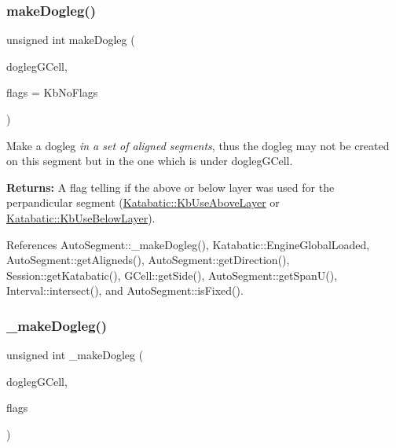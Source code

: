 \mbox{\label{classKatabatic_1_1AutoSegment_aa21b16647c1750ba8b3eb9d99b12f073}} 
\subsubsection{\texorpdfstring{make\+Dogleg()}{makeDogleg()}\hspace{0.1cm}{\footnotesize\ttfamily [3/3]}}
{\footnotesize\ttfamily unsigned int make\+Dogleg (\begin{DoxyParamCaption}\item[{\mbox{\hyperlink{classKatabatic_1_1GCell}{G\+Cell}} $\ast$}]{dogleg\+G\+Cell,  }\item[{unsigned int}]{flags = {\ttfamily KbNoFlags} }\end{DoxyParamCaption})}

Make a dogleg {\itshape in a set of aligned segments}, thus the dogleg may not be created on {\ttfamily this} segment but in the one which is under {\ttfamily dogleg\+G\+Cell}.

{\bfseries Returns\+:} A flag telling if the above or below layer was used for the perpandicular segment (\mbox{\hyperlink{namespaceKatabatic_a2af2ad6b6441614038caf59d04b3b217af756099f1bbe259dd1bf22067dc40eac}{Katabatic\+::\+Kb\+Use\+Above\+Layer}} or \mbox{\hyperlink{namespaceKatabatic_a2af2ad6b6441614038caf59d04b3b217a41cbd981337678e042354f340bfae25d}{Katabatic\+::\+Kb\+Use\+Below\+Layer}}). 

References Auto\+Segment\+::\+\_\+make\+Dogleg(), Katabatic\+::\+Engine\+Global\+Loaded, Auto\+Segment\+::get\+Aligneds(), Auto\+Segment\+::get\+Direction(), Session\+::get\+Katabatic(), G\+Cell\+::get\+Side(), Auto\+Segment\+::get\+Span\+U(), Interval\+::intersect(), and Auto\+Segment\+::is\+Fixed().

\mbox{\label{classKatabatic_1_1AutoSegment_a37a14b40295ccb50cd5001891385807b}} 
\subsubsection{\texorpdfstring{\+\_\+make\+Dogleg()}{\_makeDogleg()}}
{\footnotesize\ttfamily unsigned int \+\_\+make\+Dogleg (\begin{DoxyParamCaption}\item[{\mbox{\hyperlink{classKatabatic_1_1GCell}{G\+Cell}} $\ast$}]{dogleg\+G\+Cell,  }\item[{unsigned int}]{flags }\end{DoxyParamCaption})\hspace{0.3cm}{\ttfamily [pure virtual]}}

